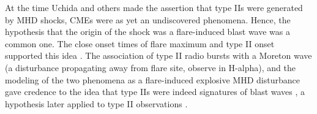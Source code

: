 At the time Uchida and others made the assertion that type IIs were generated by MHD shocks, CMEs were as yet an undiscovered phenomena. Hence, the hypothesis that the origin of the shock was a flare-induced blast wave was a common one. The close onset times of flare maximum and type II onset supported this idea \citep{maxwell1962}. The association of type II radio bursts with a Moreton wave (a disturbance propagating away from flare site, observe in H-alpha), and the modeling of the two phenomena as a flare-induced explosive MHD disturbance gave credence to the idea that type IIs were indeed signatures of blast waves \citep{uchida1974}, a hypothesis later applied to type II observations \citep{kosugi1976}. 

